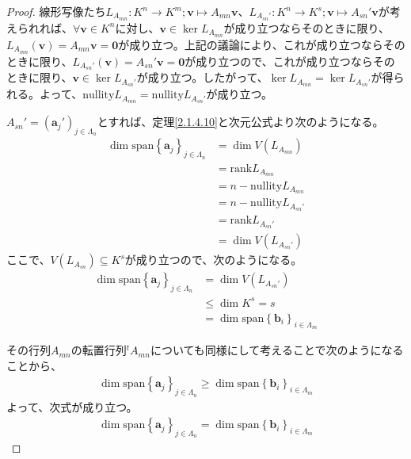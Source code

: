 \documentclass[dvipdfmx]{jsarticle}
\begin{document}
\begin{proof}
線形写像たち$L_{A_{mn}}:K^{n} \rightarrow K^{m};\mathbf{v} \mapsto A_{mn}\mathbf{v}$、$L_{A_{sn}'}:K^{n} \rightarrow K^{s};\mathbf{v} \mapsto A_{sn}'\mathbf{v}$が考えられれば、$\forall\mathbf{v} \in K^{n}$に対し、$\mathbf{v} \in \ker L_{A_{mn}}$が成り立つならそのときに限り、$L_{A_{mn}}\left( \mathbf{v} \right) = A_{mn}\mathbf{v} = \mathbf{0}$が成り立つ。上記の議論により、これが成り立つならそのときに限り、$L_{A_{sn}'}\left( \mathbf{v} \right) = A_{sn}'\mathbf{v} = \mathbf{0}$が成り立つので、これが成り立つならそのときに限り、$\mathbf{v} \in \ker L_{A_{sn}'}$が成り立つ。したがって、$\ker L_{A_{mn}} = \ker L_{A_{sn}'}$が得られる。よって、${\mathrm{nullity}}L_{A_{mn}} = {\mathrm{nullity}}L_{A_{sn}'}$が成り立つ。\par
$A_{sn}' = \left( \mathbf{a}_{j}' \right)_{j \in \varLambda_{n}}$とすれば、定理\ref{2.1.4.10}と次元公式より次のようになる。
\begin{align*}
\dim{{\mathrm{span} }\left\{ \mathbf{a}_{j} \right\}_{j \in \varLambda_{n}}} &= \dim{V\left( L_{A_{mn}} \right)}\\
&= {\mathrm{rank} }L_{A_{mn}}\\
&= n - {\mathrm{nullity}}L_{A_{mn}}\\
&= n - {\mathrm{nullity}}L_{A_{sn}'}\\
&= {\mathrm{rank} }L_{A_{sn}'}\\
&= \dim{V\left( L_{A_{sn}'} \right)}
\end{align*}
ここで、$V\left( L_{A_{sn}} \right) \subseteq K^{s}$が成り立つので、次のようになる。
\begin{align*}
\dim{{\mathrm{span} }\left\{ \mathbf{a}_{j} \right\}_{j \in \varLambda_{n}}} &= \dim{V\left( L_{A_{sn}'} \right)}\\
&\leq \dim K^{s} = s\\
&= \dim{{\mathrm{span} }\left\{ \mathbf{b}_{i} \right\}_{i \in \varLambda_{m}}}
\end{align*}\par
その行列$A_{mn}$の転置行列${}^{t}A_{mn}$についても同様にして考えることで次のようになることから、
\begin{align*}
\dim{{\mathrm{span} }\left\{ \mathbf{a}_{j} \right\}_{j \in \varLambda_{n}}} \geq \dim{{\mathrm{span} }\left\{ \mathbf{b}_{i} \right\}_{i \in \varLambda_{m}}}
\end{align*}
よって、次式が成り立つ。
\begin{align*}
\dim{{\mathrm{span} }\left\{ \mathbf{a}_{j} \right\}_{j \in \varLambda_{n}}} = \dim{{\mathrm{span} }\left\{ \mathbf{b}_{i} \right\}_{i \in \varLambda_{m}}}
\end{align*}
\end{proof}
\end{document}
